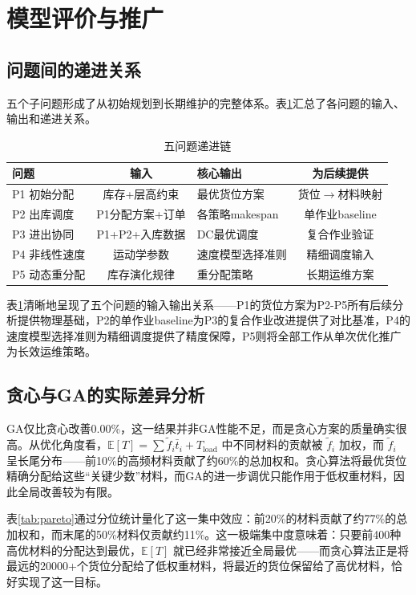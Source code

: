 \documentclass[a4paper]{cumcmthesis}
\newcommand{\headcol}{\rowcolor{tableheadcolor}}
\newcommand{\ftilde}{\tilde{f}}
\begin{document}
\section{模型评价与推广}

\subsection{问题间的递进关系}

五个子问题形成了从初始规划到长期维护的完整体系。表\ref{tab:progression}汇总了各问题的输入、输出和递进关系。

\begin{table}[htbp]
\centering\small
\caption{五问题递进链}
\label{tab:progression}
\begin{tabular}{lclc}
\toprule
\headcol 问题 & 输入 & 核心输出 & 为后续提供 \\
\midrule
P1 初始分配 & 库存+层高约束 & 最优货位方案 & 货位$\to$材料映射 \\
P2 出库调度 & P1分配方案+订单 & 各策略makespan & 单作业baseline \\
P3 进出协同 & P1+P2+入库数据 & DC最优调度 & 复合作业验证 \\
P4 非线性速度 & 运动学参数 & 速度模型选择准则 & 精细调度输入 \\
P5 动态重分配 & 库存演化规律 & 重分配策略 & 长期运维方案 \\
\bottomrule
\end{tabular}
\end{table}

表\ref{tab:progression}清晰地呈现了五个问题的输入输出关系——P1的货位方案为P2-P5所有后续分析提供物理基础，P2的单作业baseline为P3的复合作业改进提供了对比基准，P4的速度模型选择准则为精细调度提供了精度保障，P5则将全部工作从单次优化推广为长效运维策略。

\subsection{贪心与GA的实际差异分析}

GA仅比贪心改善0.00\%，这一结果并非GA性能不足，而是贪心方案的质量确实很高。从优化角度看，$\mathbb{E}[T]=\sum\ftilde_i\bar{t}_i+T_{\text{load}}$ 中不同材料的贡献被 $\ftilde_i$ 加权，而 $\ftilde_i$ 呈长尾分布——前10\%的高频材料贡献了约60\%的总加权和。贪心算法将最优货位精确分配给这些``关键少数''材料，而GA的进一步调优只能作用于低权重材料，因此全局改善较为有限。

表\ref{tab:pareto}通过分位统计量化了这一集中效应：前20\%的材料贡献了约77\%的总加权和，而末尾的50\%材料仅贡献约11\%。这一极端集中度意味着：只要前400种高优材料的分配达到最优，$\mathbb{E}[T]$ 就已经非常接近全局最优——而贪心算法正是将最远的20000+个货位分配给了低权重材料，将最近的货位保留给了高优材料，恰好实现了这一目标。
\end{document}
